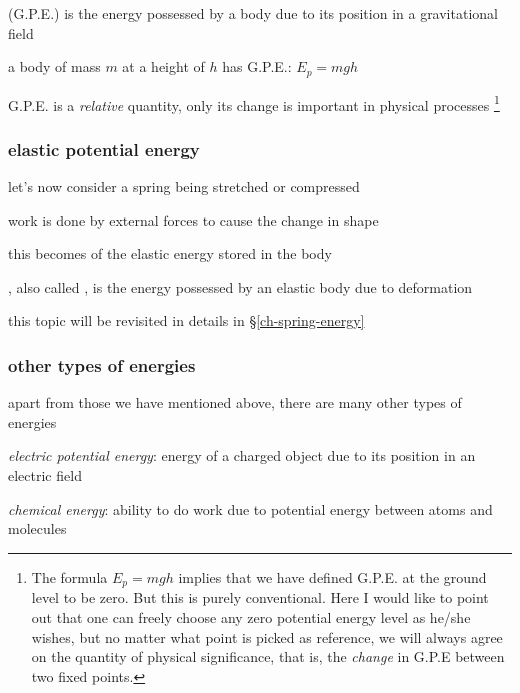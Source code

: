 \begin{ilight}
	 (G.P.E.) is the energy possessed by a body due to its position in a gravitational field
\end{ilight}

\cmt a body of mass $m$ at a height of $h$ has G.P.E.: $\boxed{E_p = mgh}$

\cmt G.P.E. is a \emph{relative} quantity, only its change is important in physical processes
\footnote{The formula $E_p = mgh$ implies that we have defined G.P.E. at the ground level to be zero. But this is purely conventional. Here I would like to point out that one can freely choose any zero potential energy level as he/she wishes, but no matter what point is picked as reference, we will always agree on the quantity of physical significance, that is, the \emph{change} in G.P.E between two fixed points.}






\subsubsection{elastic potential energy}

let's now consider a spring being stretched or compressed

work is done by external forces to cause the change in shape

this becomes of the elastic energy stored in the body

\begin{ilight}
	, also called , is the energy possessed by an elastic body due to deformation 
\end{ilight}

this topic will be revisited in details in \S\ref{ch-spring-energy}

\subsubsection{other types of energies}

apart from those we have mentioned above, there are many other types of energies 

\titem \emph{electric potential energy}: energy of a charged object due to its position in an electric field

\titem \emph{chemical energy}: ability to do work due to potential energy between atoms and molecules

